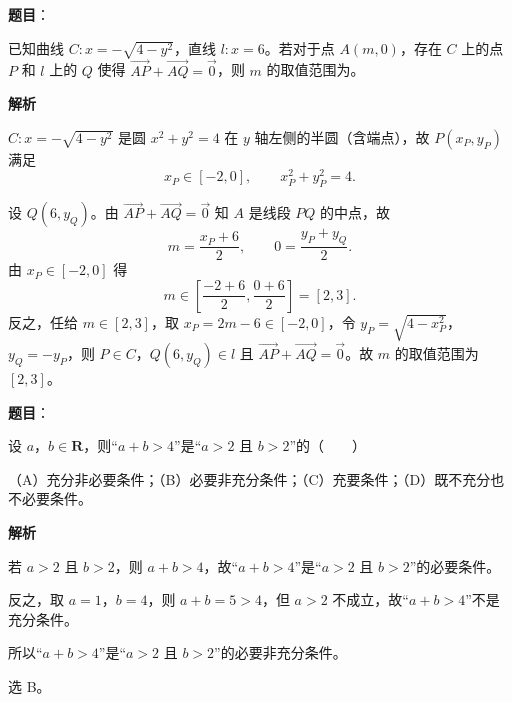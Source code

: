 \begin{answer}

\textbf{题目}：

已知曲线 $C:x=-\sqrt{4-y^2}$，直线 $l:x=6$。若对于点 $A(m,0)$，存在 $C$ 上的点 $P$ 和 $l$ 上的 $Q$ 使得 $\overrightarrow{AP}+\overrightarrow{AQ}=\vec{0}$，则 $m$ 的取值范围为\gkblank{}。

\textbf{解析}

$C:x=-\sqrt{4-y^2}$ 是圆 $x^2+y^2=4$ 在 $y$ 轴左侧的半圆（含端点），故 $P(x_P,y_P)$ 满足
\nopagebreak[4]
\[x_P\in[-2,0],\qquad x_P^2+y_P^2=4 .\]

设 $Q(6,y_Q)$。由 $\overrightarrow{AP}+\overrightarrow{AQ}=\vec{0}$ 知 $A$ 是线段 $PQ$ 的中点，故
\nopagebreak[4]
\[m=\frac{x_P+6}{2},\qquad 0=\frac{y_P+y_Q}{2}.\]
由 $x_P\in[-2,0]$ 得
\nopagebreak[4]
\[m\in\left[\frac{-2+6}2,\frac{0+6}2\right]=[2,3].\]
反之，任给 $m\in[2,3]$，取 $x_P=2m-6\in[-2,0]$，令 $y_P=\sqrt{4-x_P^2}$，$y_Q=-y_P$，则 $P\in C$，$Q(6,y_Q)\in l$ 且 $\overrightarrow{AP}+\overrightarrow{AQ}=\vec{0}$。故 $m$ 的取值范围为 $[2,3]$。


\end{answer}
\begin{answer}

\textbf{题目}：

设 $a$，$b\in\mathbf R$，则“$a+b>4$”是“$a>2$ 且 $b>2$”的\mbox{（　　）}

（A）充分非必要条件；（B）必要非充分条件；（C）充要条件；（D）既不充分也不必要条件。

\textbf{解析}

若 $a>2$ 且 $b>2$，则 $a+b>4$，故“$a+b>4$”是“$a>2$ 且 $b>2$”的必要条件。

反之，取 $a=1$，$b=4$，则 $a+b=5>4$，但 $a>2$ 不成立，故“$a+b>4$”不是充分条件。

所以“$a+b>4$”是“$a>2$ 且 $b>2$”的必要非充分条件。

选 B。


\end{answer}
